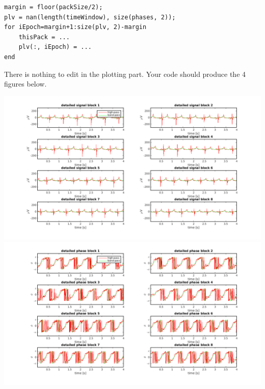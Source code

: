 \documentclass[10pt,a4paper,notitlepage]{report}
\begin{document}
\begin{verbatim}
margin = floor(packSize/2);
plv = nan(length(timeWindow), size(phases, 2));
for iEpoch=margin+1:size(plv, 2)-margin
    thisPack = ...
    plv(:, iEpoch) = ...
end
\end{verbatim}

There is nothing to edit in the plotting part. Your code should produce the 4 figures below.

\vspace{1cm}
\hspace{-1cm} \includegraphics[scale=0.25]{p2fig7.png}
\includegraphics[scale=0.25]{p2fig8.png}
\end{document}
